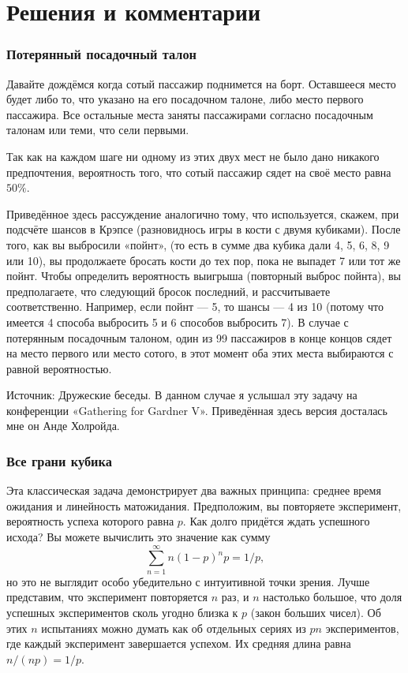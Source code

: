 \section*{Решения и комментарии}

\subsubsection*{Потерянный посадочный талон}%

Давайте дождёмся когда сотый пассажир поднимется на борт. 
Оставшееся место будет либо то, что указано на его посадочном талоне, либо место первого пассажира.
Все остальные места заняты пассажирами согласно посадочным талонам или теми, что сели первыми.

Так как на каждом шаге ни одному из этих двух мест не было дано никакого предпочтения, вероятность того, что сотый пассажир сядет на своё место равна $50\%$.
\heart

Приведённое здесь рассуждение аналогично тому, что используется, скажем, при подсчёте шансов в Крэпсе (разновиднось игры в кости с двумя кубиками).
После того, как вы выбросили «пойнт»,
(то есть в сумме два кубика дали 4, 5, 6, 8, 9 или 10), вы продолжаете бросать кости до тех пор, пока не выпадет 7 или тот же пойнт.
Чтобы определить вероятность выигрыша (повторный выброс пойнта), вы предполагаете, что следующий бросок последний, и рассчитываете соответственно.
Например, если пойнт --- 5, то шансы --- 4 из 10 (потому что имеется 4 способа выбросить 5 и 6 способов выбросить 7).
В случае с потерянным посадочным талоном, один из 99 пассажиров в конце концов сядет на место первого или место сотого, в этот момент оба этих места выбираются с равной вероятностью. 

\medskip

Источник: Дружеские беседы.
В данном случае я услышал эту задачу на конференции «Gathering for Gardner V».
Приведённая здесь версия досталась мне он Анде Холройда. %

\subsubsection*{Все грани кубика}%

Эта классическая задача демонстрирует два важных принципа: среднее время ожидания и линейность матожидания. %
Предположим, вы повторяете эксперимент, вероятность успеха которого равна $p$.
Как долго придётся ждать успешного исхода? Вы можете вычислить это значение как сумму
\[\sum_{n=1}^\infty n(1-p)^np=1/p,\]
но это не выглядит особо убедительно с интуитивной точки зрения.
Лучше представим, что эксперимент повторяется $n$ раз, и $n$ настолько большое, что доля успешных экспериментов сколь угодно близка к $p$ (закон больших чисел).
Об этих $n$ испытаниях можно думать как об отдельных сериях из $pn$ экспериментов, где каждый эксперимент завершается успехом.
Их средняя длина равна $n/(np)=1/p$.

